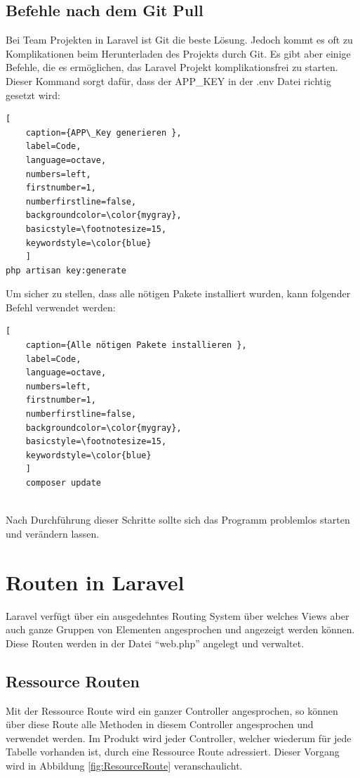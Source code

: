 \subsection{Befehle nach dem Git Pull} \label{sec: Git}
Bei Team Projekten in Laravel ist Git die beste Lösung. Jedoch kommt es oft zu Komplikationen beim Herunterladen des Projekts durch Git. Es gibt aber einige Befehle, die es ermöglichen, das Laravel Projekt komplikationsfrei zu starten.
Dieser Kommand sorgt dafür, dass der APP\_KEY in der .env Datei richtig gesetzt wird:
\begin{lstlisting}[
	caption={APP\_Key generieren },
	label=Code,
	language=octave,
	numbers=left,
	firstnumber=1,
	numberfirstline=false,
	backgroundcolor=\color{mygray},
	basicstyle=\footnotesize=15,
	keywordstyle=\color{blue}
	]
php artisan key:generate 

\end{lstlisting}
Um sicher zu stellen, dass alle nötigen Pakete installiert wurden, kann folgender Befehl verwendet werden:
\begin{lstlisting}[
	caption={Alle nötigen Pakete installieren },
	label=Code,
	language=octave,
	numbers=left,
	firstnumber=1,
	numberfirstline=false,
	backgroundcolor=\color{mygray},
	basicstyle=\footnotesize=15,
	keywordstyle=\color{blue}
	]
	composer update
	
\end{lstlisting}
Nach Durchführung dieser Schritte sollte sich das Programm problemlos starten und verändern lassen.


\newpage
\section{Routen in Laravel}
Laravel verfügt über ein ausgedehntes Routing System über welches Views aber auch ganze Gruppen von Elementen angesprochen und angezeigt werden können. Diese Routen werden in der Datei “web.php” angelegt und verwaltet.
\subsection{Ressource Routen} 
Mit der Ressource Route wird ein ganzer Controller angesprochen, so können über diese Route alle Methoden in diesem Controller angesprochen und verwendet werden. Im Produkt wird jeder Controller, welcher wiederum für jede Tabelle vorhanden ist, durch eine Ressource Route adressiert. Dieser Vorgang wird in Abbildung \ref{fig:ResourceRoute} veranschaulicht.

